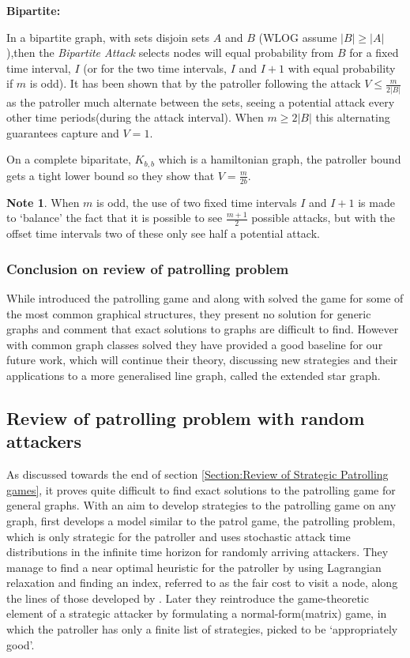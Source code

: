 \documentclass[a4paper,10pt]{article}
\theoremstyle{definition}
\theoremstyle{definition}
\theoremstyle{remark}
\theoremstyle{definition}
\newtheorem*{note}{Note}
\begin{document}
\textbf{Bipartite:}

In a bipartite graph, with sets disjoin sets $A$ and $B$ (WLOG assume $|B| \geq |A|$),then the \textit{Bipartite Attack} selects nodes will equal probability from $B$ for a fixed time interval, $I$ (or for the two time intervals, $I$ and $I+1$ with equal probability if $m$ is odd). It has been shown that by the patroller following the attack $V \leq \frac{m}{2|B|}$ as the patroller much alternate between the sets, seeing a potential attack every other time periods(during the attack interval). When $m \geq 2|B|$ this alternating guarantees capture and $V=1$.

On a complete biparitate, $K_{b,b}$ which is a hamiltonian graph, the patroller bound gets a tight lower bound so they show that $V=\frac{m}{2b}$.

\begin{note}
When $m$ is odd, the use of two fixed time intervals $I$ and $I+1$ is made to `balance' the fact that it is possible to see $\frac{m+1}{2}$ possible attacks, but with the offset time intervals two of these only see half a potential attack.
\end{note}

\subsubsection{Conclusion on review of patrolling problem}
While \cite{Alpern2011} introduced the patrolling game and along with \cite{Papadaki2016} solved the game for some of the most common graphical structures, they present no solution for generic graphs and comment that exact solutions to graphs are difficult to find. However with common graph classes solved they have provided a good baseline for our future work, which will continue their theory, discussing new strategies and their applications to a more generalised line graph, called the extended star graph.

\subsection{Review of patrolling problem with random attackers}
\label{Section:Review of patrolling problem with random attackers}
As discussed towards the end of section \ref{Section:Review of Strategic Patrolling games}, it proves quite difficult to find exact solutions to the patrolling game for general graphs. With an aim to develop strategies to the patrolling game on any graph, \cite{Lin2013} first develops a model similar to the patrol game, the patrolling problem, which is only strategic for the patroller and uses stochastic attack time distributions in the infinite time horizon for randomly arriving attackers. They manage to find a near optimal heuristic for the patroller by using Lagrangian relaxation and finding an index, referred to as the fair cost to visit a node, along the lines of those developed by \cite{Whittle1988}. Later they reintroduce the game-theoretic element of a strategic attacker by formulating a normal-form(matrix) game, in which the patroller has only a finite list of strategies, picked to be `appropriately good'.
\end{document}
